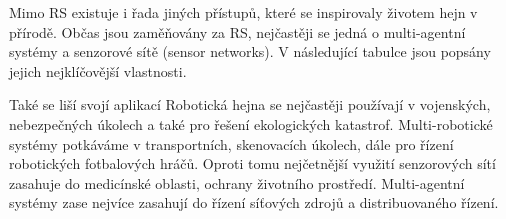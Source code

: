 \par 
Mimo RS existuje i řada jiných přístupů, které se inspirovaly životem hejn v přírodě. Občas jsou zaměňovány za RS, nejčastěji se jedná o multi-agentní systémy a senzorové sítě (sensor networks). V následující tabulce jsou popsány jejich nejklíčovější vlastnosti. \par
\begin{center}
    \begin{table}[h] 
	\caption{Porovnání systémů s více agenty}
    \end{table}
    \end{center}
    Také se liší svojí aplikací Robotická hejna se nejčastěji používají v vojenských, nebezpečných úkolech a také pro řešení ekologických katastrof. Multi-robotické systémy potkáváme v transportních, skenovacích úkolech, dále pro řízení robotických fotbalových hráčů. Oproti tomu nejčetnější využití senzorových sítí zasahuje do medicínské oblasti, ochrany životního prostředí. Multi-agentní systémy zase nejvíce zasahují do řízení síťových zdrojů a distribuovaného řízení. 
